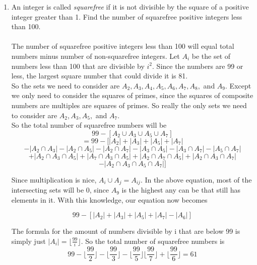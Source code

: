 \documentclass[12pt]{article}
\begin{document}
\begin{enumerate}

\item An integer is called {\em squarefree} if it is not divisible by the square of a positive integer greater than 1. Find the number of squarefree positive integers less than 100.\\\\
The number of squarefree positive integers less than 100 will equal total numbers minus number of non-squarefree integers. Let $A_i$ be the set of numbers less than 100 that are divisible by $i^2$. Since the numbers are 99 or less, the largest square number that could divide it is 81. \\
So the sets we need to consider are $A_2,A_3,A_4,A_5,A_6,A_7,A_8,$ and $A_9.$
Except we only need to consider the squares of primes, since the squares of composite numbers are multiples are squares of primes. So really the only sets we need to consider are $A_2,A_3,A_5,$ and $A_7$.\\
So the total number of squarefree numbers will be
	\[99 - [A_2\cup A_3\cup A_5\cup A_7]\]
	\[= 99 - [|A_2|+|A_3|+|A_5|+|A_7|\]
	\[- |A_2\cap A_3|- |A_2\cap A_5|- |A_2\cap A_7| - |A_3\cap A_5| - |A_3\cap A_7| - |A_5\cap A_7| \]
	\[+ |A_2\cap A_3 \cap A_5| + |A_7\cap A_3 \cap A_5| + |A_2\cap A_7 \cap A_5| + |A_2\cap A_3 \cap A_7| \]
	\[- |A_2\cap A_3 \cap A_5 \cap A_7|]\]

Since multiplication is nice, $A_i\cup A_j = A_{ij}$. In the above equation, most of the intersecting sets will be 0, since $A_9$ is the highest any can be that still has elements in it. With this knowledge, our equation now becomes

\[99 - \left[|A_2|+|A_3|+|A_5|+|A_7|-|A_6|\right]\]

The formula for the amount of numbers divisible by i that are below 99 is simply just $|A_i| = \lfloor\frac{99}{i}\rfloor$. So the total number of squarefree numbers is 
\[99 - \lfloor\frac{99}{2}\rfloor-\lfloor\frac{99}{3}\rfloor-\lfloor\frac{99}{5}\rfloor\lfloor\frac{99}{7}\rfloor + \lfloor\frac{99}{6}\rfloor = 61\]

\medskip


\end{enumerate}
\end{document}
